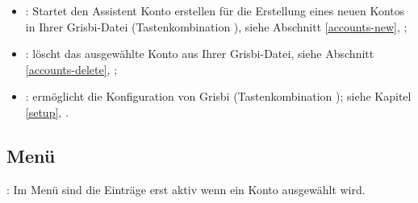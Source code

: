 \begin{itemize}
\begin{itemize}
		\end{itemize}
	\item {}: Startet den Assistent Konto erstellen für die Erstellung eines neuen Kontos in Ihrer Grisbi-Datei (Tastenkombination ), siehe Abschnitt \vref{accounts-new}, ;
	\item {}: löscht das ausgewählte Konto aus Ihrer Grisbi-Datei, siehe Abschnitt \vref{accounts-delete}, ;
	\item {}: ermöglicht die Konfiguration von Grisbi (Tastenkombination ); siehe Kapitel \vref{setup}, .
\end{itemize}


\subsection{Menü \label{home-menus-display}}

\Note{}: Im Menü  sind die Einträge erst aktiv wenn ein Konto ausgewählt wird.


